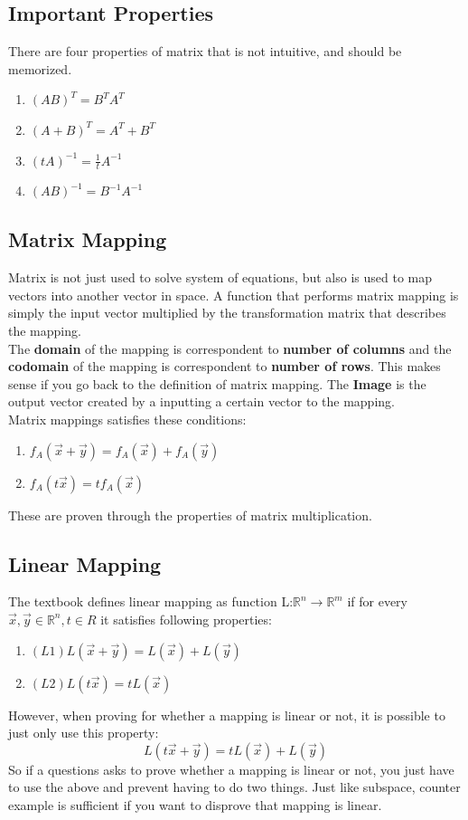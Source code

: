 \documentclass[12pt]{article}
\newcommand{\R}{\mathbb{R}}
\begin{document}
\subsection{Important Properties}
There are four properties of matrix that is not intuitive, and should be memorized.

\begin{enumerate}
\item{$(AB)^T = B^TA^T$}
\item{$(A+B)^T = A^T + B^T$}
\item{$(tA)^{-1} = \frac{1}{t}A^{-1}$}
\item{$(AB)^{-1} = B^{-1}A^{-1}$}
\end{enumerate}


\subsection{Matrix Mapping}
Matrix is not just used to solve system of equations, but also is used to map vectors into another vector in space. A function that performs matrix mapping is simply the input vector multiplied by the transformation matrix that describes the mapping.\\
The \textbf{domain} of the mapping is correspondent to \textbf{number of columns} and the \textbf{codomain} of the mapping is correspondent to \textbf{number of rows}. This makes sense if you go back to the definition of matrix mapping. The \textbf{Image} is the output vector created by a inputting a certain vector to the mapping.\\
Matrix mappings satisfies these conditions:
\begin{enumerate}
\item $f_A(\vec{x}+\vec{y}) = f_A(\vec{x}) + f_A(\vec{y})$
\item$f_A(t\vec{x}) = tf_A(\vec{x})$
\end{enumerate}
These are proven through the properties of matrix multiplication.

\subsection{Linear Mapping}
The textbook defines linear mapping as function L:$\R^n \rightarrow \R^m$ if for every $\vec{x}, \vec{y} \in \R^n, t\in R$ it satisfies following properties:

\begin{center}
\begin{enumerate}
\item$(L1) L(\vec{x} + \vec{y}) = L(\vec{x}) + L(\vec{y})$
\item$(L2) L(t\vec{x}) = tL(\vec{x})$
\end{enumerate}
\end{center}
However, when proving for whether a mapping is linear or not, it is possible to just only use this property:
\begin{equation}
L(t\vec{x}+\vec{y}) =tL(\vec{x}) + L(\vec{y})
\end{equation}
So if a questions asks to prove whether a mapping is linear or not, you just have to use the above and prevent having to do two things. Just like subspace, counter example is sufficient if you want to disprove that mapping is linear.
\end{document}
